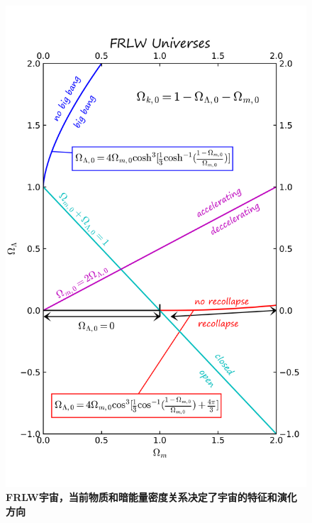 \documentclass[14pt]{article}
\begin{document}
\begin{figure}[H]
\centering
\includegraphics[scale=0.85]{Universes.png}
\caption{\textbf{FRLW宇宙，当前物质和暗能量密度关系决定了宇宙的特征和演化方向}}
\end{figure}

\pagebreak


\end{document}
